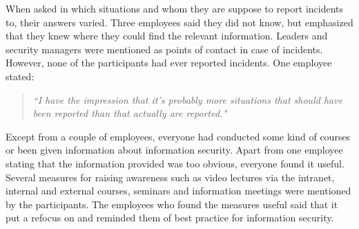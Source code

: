 When asked in which situations and whom they are suppose to report incidents to, their answers varied. Three employees said they did not know, but emphasized that they knew where they could find the relevant information. Leaders and security managers were mentioned as points of contact in case of incidents. However, none of the participants had ever reported incidents. One employee stated: 
\begin{quote}
\textit{``I have the impression that it's probably more situations that should have been reported than that actually are reported."}
\end{quote}

Except from a couple of employees, everyone had conducted some kind of courses or been given information about information security. Apart from one employee stating that the information provided was too obvious, everyone found it useful. Several measures for raising awareness such as video lectures via the intranet, internal and external courses, seminars and information meetings were mentioned by the participants. The employees who found the measures useful said that it put a refocus on and reminded them of best practice for information security.